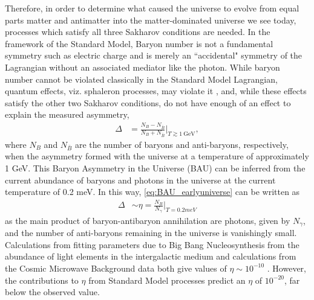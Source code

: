 Therefore, in order to determine what caused the universe to evolve from equal parts matter and antimatter into the matter-dominated universe we see today, processes which satisfy all three Sakharov conditions are needed. In the framework of the Standard Model, Baryon number is not a fundamental symmetry such as electric charge and is merely an ``accidental" symmetry of the Lagrangian without an associated mediator like the photon.
While baryon number cannot be violated classically in the Standard Model Lagrangian, quantum effects, viz. sphaleron processes, may violate it \cite{PhysRevLett.37.8} \cite{KUZMIN198536}, and, while these effects satisfy the other two Sakharov conditions, do not have enough of an effect to explain the measured asymmetry,
\begin{align}
\Delta &= \frac{N_B - N_{\bar{B}}} {N_B + N_{\bar{B}}} \biggr\rvert_{T \gtrsim 1~\textrm{GeV}},
\label{eq:BAU_earlyuniverse}
\end{align}
where $N_B$ and $N_{\bar{B}}$ are the number of baryons and anti-baryons, respectively, when the asymmetry formed with the universe at a temperature of approximately 1 GeV.
This Baryon Asymmetry in the Universe (BAU) can be inferred from the current abundance of baryons and photons in the universe at the current temperature of 0.2 meV.
In this way, \autoref{eq:BAU_earlyuniverse} can be written as
\begin{align}
    \Delta &\sim \eta = \frac{N_B}{N_\gamma} \biggr\rvert_{T = 0.2 meV}
    \label{eq:eta_lateuniverse}
\end{align}
as the main product of baryon-antibaryon annihilation are photons, given by $N_\gamma$, and the number of anti-baryons remaining in the universe is vanishingly small.
Calculations from fitting parameters due to Big Bang Nucleosynthesis from the abundance of light elements in the intergalactic medium and calculations from the Cosmic Microwave Background data both give values of $\eta\sim 10^{-10}$ \cite{Canetti:2012zc}.
However, the contributions to $\eta$ from Standard Model processes predict an $\eta$ of $10^{-20}$, far below the observed value.

